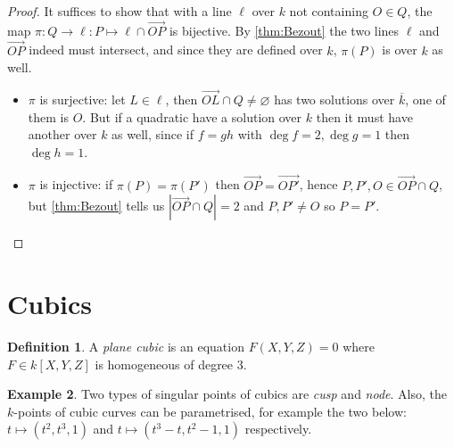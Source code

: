\documentclass{article}
\theoremstyle{definition}
\newtheorem{defn}{Definition}[subsection]
\newtheorem{example}[defn]{Example}
\begin{document}
\begin{proof}
It suffices to show that with a line $\ell$ over $k$ not containing $O\in Q$, the map $\pi:Q\rightarrow\ell:P\mapsto\ell\cap\overrightarrow{OP}$ is bijective. By \ref{thm:Bezout} the two lines $\ell$ and $\overrightarrow{OP}$ indeed must intersect, and since they are defined over $k$, $\pi(P)$ is over $k$ as well.
\begin{itemize}
\item $\pi$ is surjective: let $L\in\ell$, then $\overrightarrow{OL}\cap Q\neq\varnothing$ has two solutions over $\overline k$, one of them is $O$. But if a quadratic have a solution over $k$ then it must have another over $k$ as well, since if $f=gh$ with $\deg f=2,\deg g=1$ then $\deg h=1$.
\item $\pi$ is injective: if $\pi(P)=\pi(P')$ then $\overrightarrow{OP}=\overrightarrow{OP'}$, hence $P,P',O\in\overrightarrow{OP}\cap Q$, but \ref{thm:Bezout} tells us $|\overrightarrow{OP}\cap Q|=2$ and $P,P'\neq O$ so $P=P'$.
\end{itemize}
\end{proof}

\section{Cubics}
\begin{defn}
A \textit{plane cubic} is an equation $F(X,Y,Z)=0$ where $F\in k[X,Y,Z]$ is homogeneous of degree 3.
\end{defn}

\begin{example}
Two types of singular points of cubics are \textit{cusp} and \textit{node}. Also, the $k$-points of cubic curves can be parametrised, for example the two below: $t\mapsto (t^2,t^3,1)$ and $t\mapsto (t^3-t,t^2-1,1)$ respectively.
\end{example}
\end{document}
